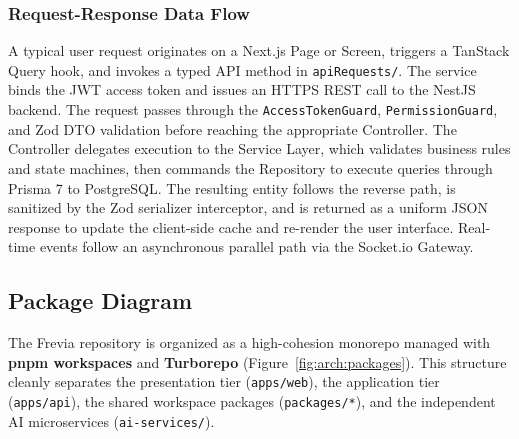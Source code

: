 \subsubsection*{Request-Response Data Flow}
A typical user request originates on a Next.js Page or Screen, triggers a TanStack Query hook, and invokes a typed API method in \texttt{apiRequests/}. The service binds the JWT access token and issues an HTTPS REST call to the NestJS backend. The request passes through the \texttt{AccessTokenGuard}, \texttt{PermissionGuard}, and Zod DTO validation before reaching the appropriate Controller. The Controller delegates execution to the Service Layer, which validates business rules and state machines, then commands the Repository to execute queries through Prisma 7 to PostgreSQL. The resulting entity follows the reverse path, is sanitized by the Zod serializer interceptor, and is returned as a uniform JSON response to update the client-side cache and re-render the user interface. Real-time events follow an asynchronous parallel path via the Socket.io Gateway.

\subsection{Package Diagram}
\label{subsec:package-diagram}

The Frevia repository is organized as a high-cohesion monorepo managed with \textbf{pnpm workspaces} and \textbf{Turborepo} (Figure~\ref{fig:arch:packages}). This structure cleanly separates the presentation tier (\texttt{apps/web}), the application tier (\texttt{apps/api}), the shared workspace packages (\texttt{packages/*}), and the independent AI microservices (\texttt{ai-services/}).


